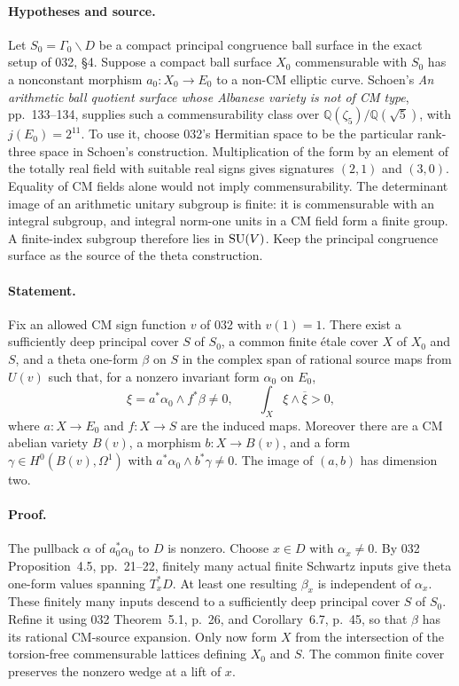 \documentclass[11pt]{article}
\newcommand{\Q}{\mathbb Q}\newcommand{\C}{\mathbb C}\newcommand{\Z}{\mathbb Z}\newcommand{\R}{\mathbb R}\newcommand{\A}{\mathbb A}\newcommand{\OO}{\mathcal O}
\theoremstyle{definition}\newtheorem{definition}[theorem]{Definition}\newtheorem{remark}[theorem]{Remark}
\begin{document}
\paragraph{Hypotheses and source.}
Let $S_0=\Gamma_0\backslash D$ be a compact principal congruence
ball surface in the exact setup of 032, \S4. Suppose a compact ball
surface $X_0$ commensurable with $S_0$ has a nonconstant morphism
$a_0:X_0\to E_0$ to a non-CM elliptic curve.
Schoen's \emph{An arithmetic ball quotient surface whose Albanese
variety is not of CM type}, pp.~133--134, supplies such a
commensurability class over $\Q(\zeta_5)/\Q(\sqrt5)$, with
$j(E_0)=2^{11}$. To use it, choose 032's Hermitian space to be the
particular rank-three space in Schoen's construction. Multiplication
of the form by an element of the totally real field with suitable
real signs gives signatures $(2,1)$ and $(3,0)$. Equality of CM
fields alone would not imply commensurability. The determinant image
of an arithmetic unitary subgroup is finite: it is commensurable
with an integral subgroup, and integral norm-one units in a CM field
form a finite group. A finite-index subgroup therefore lies in
$\operatorname{SU}(V)$. Keep the principal congruence surface as the source of the
theta construction.

\paragraph{Statement.}
Fix an allowed CM sign function $v$ of 032 with $v(1)=1$.
There exist a sufficiently deep principal cover $S$ of $S_0$, a
common finite \'etale cover $X$ of $X_0$ and $S$, and a theta
one-form $\beta$ on $S$ in the complex span of rational source maps
from $U(v)$ such that, for a nonzero invariant form $\alpha_0$ on
$E_0$,
\[
 \xi=a^*\alpha_0\wedge f^*\beta\ne0,
 \qquad \int_X\xi\wedge\overline\xi>0,
\]
where $a:X\to E_0$ and $f:X\to S$ are the induced maps. Moreover
there are a CM abelian variety $B(v)$, a morphism $b:X\to B(v)$,
and a form $\gamma\in H^0(B(v),\Omega^1)$ with
$a^*\alpha_0\wedge b^*\gamma\ne0$. The image of $(a,b)$ has
dimension two.

\paragraph{Proof.}
The pullback $\alpha$ of $a_0^*\alpha_0$ to $D$ is nonzero. Choose
$x\in D$ with $\alpha_x\ne0$. By 032 Proposition~4.5,
pp.~21--22, finitely many actual finite Schwartz inputs give theta
one-form values spanning $T_x^*D$. At least one resulting $\beta_x$
is independent of $\alpha_x$. These finitely many inputs descend to
a sufficiently deep principal cover $S$ of $S_0$. Refine it using
032 Theorem~5.1, p.~26, and Corollary~6.7, p.~45, so that $\beta$
has its rational CM-source expansion. Only now form $X$ from the
intersection of the torsion-free commensurable lattices defining
$X_0$ and $S$. The common finite cover preserves the nonzero wedge
at a lift of $x$.
\end{document}
